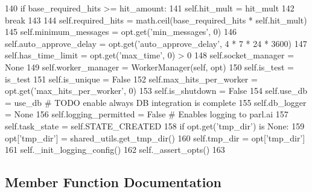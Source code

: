 \begin{DoxyCode}
140             \textcolor{keywordflow}{if} base\_required\_hits >= hit\_amount:
141                 self.hit\_mult = hit\_mult
142                 \textcolor{keywordflow}{break}
143 
144         self.required\_hits = math.ceil(base\_required\_hits * self.hit\_mult)
145         self.minimum\_messages = opt.get(\textcolor{stringliteral}{'min\_messages'}, 0)
146         self.auto\_approve\_delay = opt.get(\textcolor{stringliteral}{'auto\_approve\_delay'}, 4 * 7 * 24 * 3600)
147         self.has\_time\_limit = opt.get(\textcolor{stringliteral}{'max\_time'}, 0) > 0
148         self.socket\_manager = \textcolor{keywordtype}{None}
149         self.worker\_manager = WorkerManager(self, opt)
150         self.is\_test = is\_test
151         self.is\_unique = \textcolor{keyword}{False}
152         self.max\_hits\_per\_worker = opt.get(\textcolor{stringliteral}{'max\_hits\_per\_worker'}, 0)
153         self.is\_shutdown = \textcolor{keyword}{False}
154         self.use\_db = use\_db  \textcolor{comment}{# TODO enable always DB integration is complete}
155         self.db\_logger = \textcolor{keywordtype}{None}
156         self.logging\_permitted = \textcolor{keyword}{False}  \textcolor{comment}{# Enables logging to parl.ai}
157         self.task\_state = self.STATE\_CREATED
158         \textcolor{keywordflow}{if} opt.get(\textcolor{stringliteral}{'tmp\_dir'}) \textcolor{keywordflow}{is} \textcolor{keywordtype}{None}:
159             opt[\textcolor{stringliteral}{'tmp\_dir'}] = shared\_utils.get\_tmp\_dir()
160         self.tmp\_dir = opt[\textcolor{stringliteral}{'tmp\_dir'}]
161         self.\_init\_logging\_config()
162         self.\_assert\_opts()
163 
\end{DoxyCode}


\subsection{Member Function Documentation}
\mbox{\label{classparlai_1_1mturk_1_1core_1_1legacy__2018_1_1mturk__manager_1_1MTurkManager_a62307da39b71ecdc0b7d5ff09da4cd7a}} 
